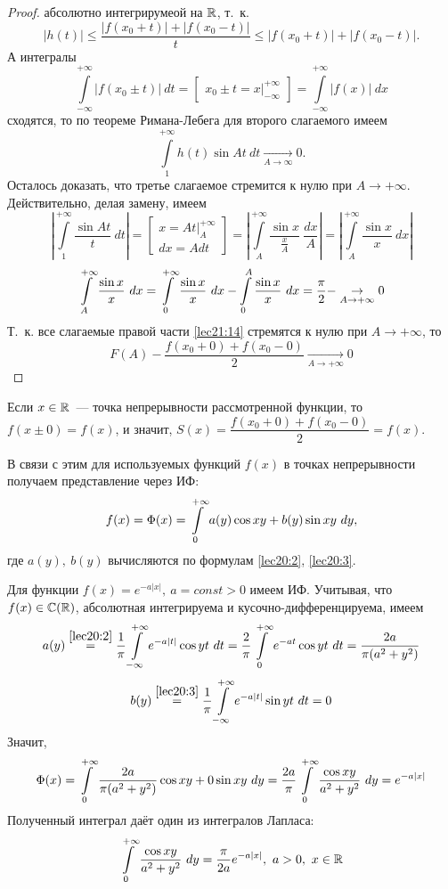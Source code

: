 \documentclass[../../main.tex]{subfiles}
\begin{document}
\begin{proof}
	абсолютно интегрирумеой на $ \mathbb{R} $, т.~к.
	\[
	|h(t)| \leq \dfrac{|f(x_0 + t)| + |f(x_0 - t)|}{t} \leq
	|f(x_0 + t)| + |f(x_0 - t)|.
	\]
	А интегралы 
	\[
	\int\limits_{-\infty}^{+\infty} |f(x_0 \pm t)|\ dt = 
	\begin{bmatrix}
	x_0 \pm t = x|_{-\infty}^{+\infty}
	\end{bmatrix} =
	\int\limits_{-\infty}^{+\infty} |f(x)|\ dx
	\] сходятся, то по теореме Римана-Лебега для второго слагаемого имеем
	\[
	\int\limits_{1}^{+\infty} h(t) \sin At\ dt
	\underset{A \to \infty}{\to} 0.
	\]
	Осталось доказать, что третье слагаемое 
	стремится к нулю при $ A \to +\infty $.\\
	Действительно, делая замену, имеем
	\[
	\left|
	\int\limits_{1}^{+\infty} \dfrac{\sin At}{t}\ dt
	\right| = \begin{bmatrix}
	x = At|_{A}^{+\infty} \\
	dx = Adt
	\end{bmatrix} = 
	\left|
	\int\limits_{A}^{+\infty} \dfrac{\sin x}{\frac{x}{A}}\ \dfrac{dx}{A}
	\right| = \left|
	\int\limits_{A}^{+\infty} \dfrac{\sin x}{x}\ dx
	\right|
	\]
	\[
	\int\limits_{A}^{+\infty} \dfrac{\sin x}{x}\ dx =
	\int\limits_{0}^{+\infty} \dfrac{\sin x}{x}\ dx - \int\limits_{0}^{A}
	\dfrac{\sin x}{x}\ dx = \dfrac{\pi}{2} -
	\underset{A \to +\infty}{\to} 0
	\]
	Т.~к. все слагаемые правой части \eqref{lec21:14} стремятся к нулю при
	$ A \to +\infty $, то
	\[
	F(A) - \dfrac{f(x_0 + 0) + f(x_0 - 0)}{2} 
	\underset{A \to +\infty}{\to} 0
	\]
\end{proof}
\begin{rem}
	Если $ x \in \mathbb{R} $~--- точка непрерывности рассмотренной функции, 
	то $ f(x \pm 0) = f(x) $, и значит, 
	$ S(x) = \dfrac{f(x_0 + 0) + f(x_0 - 0)}{2} = f(x) $.
\end{rem}
В связи с этим для используемых функций $ f(x) $ в точках непрерывности 
получаем представление через ИФ:
\[
f(x) = \Phi(x) = \int\limits_{0}^{+\infty}
a(y) \cos xy + b(y) \sin xy\ dy,
\] где $ a(y),\ b(y) $ вычисляются по формулам \eqref{lec20:2}, \eqref{lec20:3}.
\begin{exmp}
	Для функции $ f(x) = e^{-a|x|},\ a = const > 0 $ имеем ИФ. Учитывая, что
	$ f(x) \in \mathbb{C}(\mathbb{R}) $, абсолютная интегрируема и кусочно-дифференцируема, имеем
	\[
	a(y) \stackrel{\eqref{lec20:2}}{=}
	\dfrac{1}{\pi} \int\limits_{-\infty}^{+\infty}
	e^{-a|t|} \cos yt\ dt = \dfrac{2}{\pi}
	\int\limits_{0}^{+\infty} e^{-at} \cos yt\ dt =\dfrac{2a}{\pi(a^2 + y^2)}
	\] 
	\[
	b(y) \stackrel{\eqref{lec20:3}}{=}
	\dfrac{1}{\pi} \int\limits_{-\infty}^{+\infty}
	e^{-a|t|}\sin yt\ dt = 0
	\]
	Значит,
	\[
	\Phi(x) = \int\limits_{0}^{+\infty} \dfrac{2a}{\pi(a^2 + y^2)} \cos xy + 0 \sin xy\ dy =
	\dfrac{2a}{\pi} \int\limits_{0}^{+\infty} \dfrac{\cos xy}{a^2 + y^2}\ dy = e^{-a|x|}
	\]
	Полученный интеграл даёт один из интегралов Лапласа:
	\[
	\int\limits_{0}^{+\infty} \dfrac{\cos xy}{a^2 + y^2}\ dy =
	\dfrac{\pi}{2a} e^{-a|x|},\ a > 0,\ x \in \mathbb{R}
	\]
\end{exmp}
\end{document}
